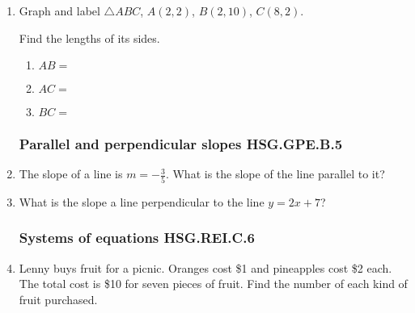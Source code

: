 \begin{enumerate}
\item Graph and label $\triangle ABC$, $A(2,2)$, $B(2,10)$, $C(8,2)$.
\begin{multicols}{2}
  \begin{flushleft}
  \end{flushleft}
    Find the lengths of its sides.
    \begin{enumerate}[itemsep=0.5cm]
      \item $AB=$
      \item $AC=$
      \item $BC=$
    \end{enumerate}
  \end{multicols}

\subsubsection*{Parallel and perpendicular slopes \hfill HSG.GPE.B.5}
\item The slope of a line is $m= -\frac{3}{5}$. What is the slope of the line parallel to it? \vspace{2cm}
\item What is the slope a line perpendicular to the line $y=2x+7$?

\newpage
\subsubsection*{Systems of equations \hfill HSG.REI.C.6}
\item Lenny buys fruit for a picnic. Oranges cost \$1 and pineapples cost \$2 each. The total cost is \$10 for seven pieces of fruit. Find the number of each kind of fruit purchased.
  \begin{flushright}
  \end{flushright}


\end{enumerate}
